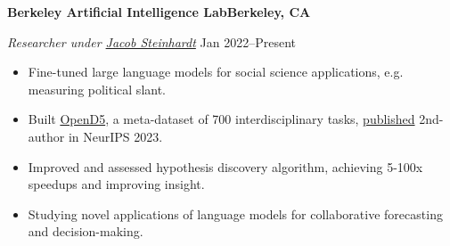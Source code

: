 \textbf{Berkeley Artificial Intelligence Lab\hfill Berkeley, CA}\par
\textit{Researcher under \href{https://jsteinhardt.stat.berkeley.edu/}{Jacob Steinhardt} } \hfill Jan 2022--Present\par
\begin{itemize}
	\item Fine-tuned large language models for social science applications, e.g. measuring political slant.
	\item Built \href{https://github.com/petezh/OpenD5}{OpenD5}, a meta-dataset of 700 interdisciplinary tasks, \href{https://arxiv.org/abs/2302.14233}{published} 2nd-author in NeurIPS 2023.
	\item Improved and assessed hypothesis discovery algorithm, achieving 5-100x speedups and improving insight.
	\item Studying novel applications of language models for collaborative forecasting and decision-making.
\end{itemize} \par